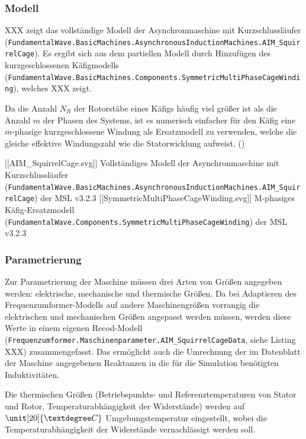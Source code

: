 \hypertarget{modell}{%
\subsubsection{Modell}\label{modell}}

XXX zeigt das vollständige Modell der Asynchronmaschine mit
Kurzschlussläufer
(\texttt{FundamentalWave.BasicMachines.AsynchronousInductionMachines.AIM\_SquirrelCage}).
Es ergibt sich aus dem partiellen Modell durch Hinzufügen des
kurzgeschlossenen Käfigmodells
(\texttt{FundamentalWave.BasicMachines.Components.SymmetricMultiPhaseCageWinding}),
welches XXX zeigt.

Da die Anzahl \(N_R\) der Rotorstäbe eines Käfigs häufig viel größer ist
als die Anzahl \(m\) der Phasen des Systems, ist es numerisch einfacher
für den Käfig eine \(m\)-phasige kurzgeschlossene Windung als
Ersatzmodell zu verwenden, welche die gleiche effektive Windungszahl wie
die Statorwicklung aufweist.
(\cite[S. 194]{kralModelicaObjektorientierteModellbildung2019})

{[}{[}AIM\_SquirrelCage.svg{]}{]} Vollständiges Modell der
Asynchronmaschine mit Kurzschlussläufer
(\texttt{FundamentalWave.BasicMachines.AsynchronousInductionMachines.AIM\_SquirrelCage})
der MSL v3.2.3 {[}{[}SymmetricMultiPhaseCageWinding.svg{]}{]} M-phasiges
Käfig-Ersatzmodell
(\texttt{FundamentalWave.Components.SymmetricMultiPhaseCageWinding}) der
MSL v3.2.3

\hypertarget{parametrierung}{%
\subsubsection{Parametrierung}\label{parametrierung}}

Zur Parametrierung der Maschine müssen drei Arten von Größen angegeben
werden: elektrische, mechanische und thermische Größen. Da bei
Adaptieren des Frequenzumformer-Modells auf andere Maschinengrößen
vorrangig die elektrischen und mechanischen Größen angepasst werden
müssen, werden diese Werte in einem eigenen Recod-Modell
(\texttt{Frequenzumformer.Maschinenparameter.AIM\_SquirrelCageData},
siehe Listing XXX) zusammengefasst. Das ermöglicht auch die Umrechnung
der im Datenblatt der Maschine angegebenen Reaktanzen in die für die
Simulation benötigten Induktivitäten.

Die thermischen Größen (Betriebspunkts- und Referenztemperaturen von
Stator und Rotor, Temperaturabhängigkeit der Widerstände) werden auf
\(\unit[20]{°C}\) Umgebungstemperatur eingestellt, wobei die
Temperaturabhängigkeit der Widerstände vernachlässigt werden soll.

